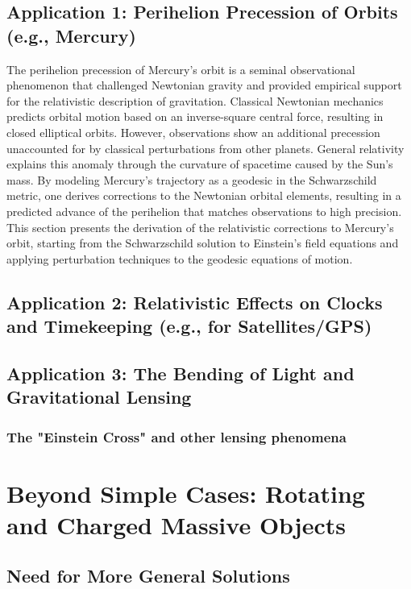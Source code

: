 \documentclass{amsart}
\theoremstyle{definition}
\theoremstyle{remark}
\begin{document}
\subsection{Application 1: Perihelion Precession of Orbits (e.g., Mercury)}
\label{subsec:mercury_precession}
The perihelion precession of Mercury’s orbit is a seminal observational phenomenon that challenged Newtonian gravity and provided empirical support for the relativistic description of gravitation. Classical Newtonian mechanics predicts orbital motion based on an inverse-square central force, resulting in closed elliptical orbits. However, observations show an additional precession unaccounted for by classical perturbations from other planets. General relativity explains this anomaly through the curvature of spacetime caused by the Sun’s mass. By modeling Mercury’s trajectory as a geodesic in the Schwarzschild metric, one derives corrections to the Newtonian orbital elements, resulting in a predicted advance of the perihelion that matches observations to high precision. This section presents the derivation of the relativistic corrections to Mercury’s orbit, starting from the Schwarzschild solution to Einstein’s field equations and applying perturbation techniques to the geodesic equations of motion.

\subsection{Application 2: Relativistic Effects on Clocks and Timekeeping (e.g., for Satellites/GPS)}

\subsection{Application 3: The Bending of Light and Gravitational Lensing}
\subsubsection{The "Einstein Cross" and other lensing phenomena}

\section{Beyond Simple Cases: Rotating and Charged Massive Objects}
\label{sec:kerr_etc}

\subsection{Need for More General Solutions}
\end{document}
